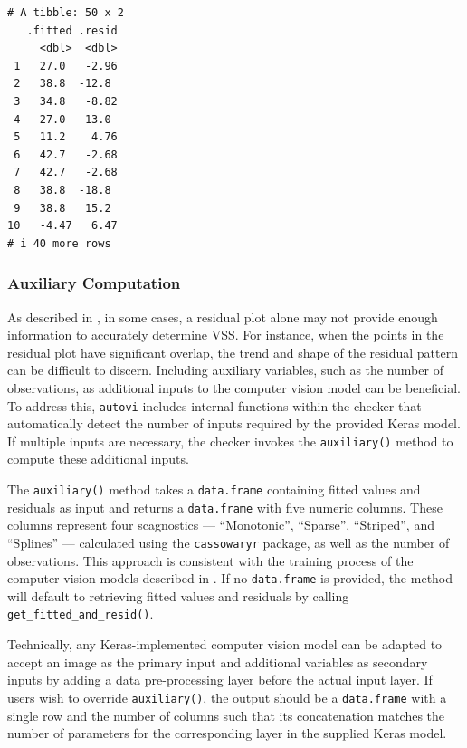 \documentclass[
doublespace,
  times]{anzsauth}
\begin{document}
\begin{verbatim}
# A tibble: 50 x 2
   .fitted .resid
     <dbl>  <dbl>
 1   27.0   -2.96
 2   38.8  -12.8 
 3   34.8   -8.82
 4   27.0  -13.0 
 5   11.2    4.76
 6   42.7   -2.68
 7   42.7   -2.68
 8   38.8  -18.8 
 9   38.8   15.2 
10   -4.47   6.47
# i 40 more rows
\end{verbatim}

\subsubsection{Auxiliary Computation}\label{auxiliary-computation}

As described in \citet{li2024automated}, in some cases, a residual plot
alone may not provide enough information to accurately determine VSS.
For instance, when the points in the residual plot have significant
overlap, the trend and shape of the residual pattern can be difficult to
discern. Including auxiliary variables, such as the number of
observations, as additional inputs to the computer vision model can be
beneficial. To address this, \texttt{autovi} includes internal functions
within the checker that automatically detect the number of inputs
required by the provided Keras model. If multiple inputs are necessary,
the checker invokes the \texttt{auxiliary()} method to compute these
additional inputs.

The \texttt{auxiliary()} method takes a \texttt{data.frame} containing
fitted values and residuals as input and returns a \texttt{data.frame}
with five numeric columns. These columns represent four scagnostics ---
``Monotonic'', ``Sparse'', ``Striped'', and ``Splines'' --- calculated
using the \texttt{cassowaryr} package, as well as the number of
observations. This approach is consistent with the training process of
the computer vision models described in \citet{li2024automated}. If no
\texttt{data.frame} is provided, the method will default to retrieving
fitted values and residuals by calling
\texttt{get\_fitted\_and\_resid()}.

Technically, any Keras-implemented computer vision model can be adapted
to accept an image as the primary input and additional variables as
secondary inputs by adding a data pre-processing layer before the actual
input layer. If users wish to override \texttt{auxiliary()}, the output
should be a \texttt{data.frame} with a single row and the number of
columns such that its concatenation matches the number of parameters for
the corresponding layer in the supplied Keras model.
\end{document}
